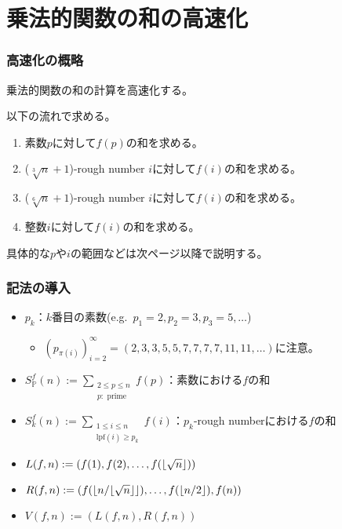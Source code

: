 \documentclass[
  lualatex,
  ja=standard,
  compress,
  hyperref={colorlinks, urlcolor=magenta, linkcolor=blue!55!black},
  dvipsnames,
  svgnames,
]{beamer}
\newcommand{\lpf}[1]{\mathrm{lpf}(#1)}
\begin{document}
\section{乗法的関数の和の高速化}
\begin{frame}
  \frametitle{高速化の概略}

  乗法的関数の和の計算を高速化する。

  以下の流れで求める。
  \begin{enumerate}
  \item 素数$p$に対して$f(p)$の和を求める。
  \item ($\sqrt[3]{n}+1$)-rough number $i$に対して$f(i)$の和を求める。
  \item ($\sqrt[6]{n}+1$)-rough number $i$に対して$f(i)$の和を求める。
  \item 整数$i$に対して$f(i)$の和を求める。
  \end{enumerate}

  具体的な$p$や$i$の範囲などは次ページ以降で説明する。
\end{frame}

\begin{frame}
  \frametitle{記法の導入}

  \begin{itemize}
  \item $p_k$：$k$番目の素数(e.g.~$p_1=2, p_2=3, p_3=5, \dots$)
    \begin{itemize}
    \item $(p_{\pi(i)})_{i=2}^{\infty} = (2, 3, 3, 5, 5, 7, 7, 7, 7, 11, 11, \dots)$に注意。
    \end{itemize}
  \item $S_{\mathbb{P}}^f(n) := \displaystyle\sum_{\substack{2\le p\le n\\p:\text{ prime}}} f(p)$：素数における$f$の和
  \item $S_k^f(n) := \displaystyle\sum_{\substack{1\le i\le n\\\lpf{i}\ge p_k}} f(i)$：$p_k$-rough numberにおける$f$の和
  \item $L(f, n) := (f(1), f(2), \dots, f(\lfloor\sqrt{n}\rfloor))$
  \item $R(f, n) := (f(\lfloor n/\lfloor\sqrt{n}\rfloor\rfloor), \dots, f(\lfloor n/2\rfloor), f(n))$
  \item $V(f, n) := (L(f, n), R(f, n))$
  \end{itemize}
\end{frame}
\end{document}
